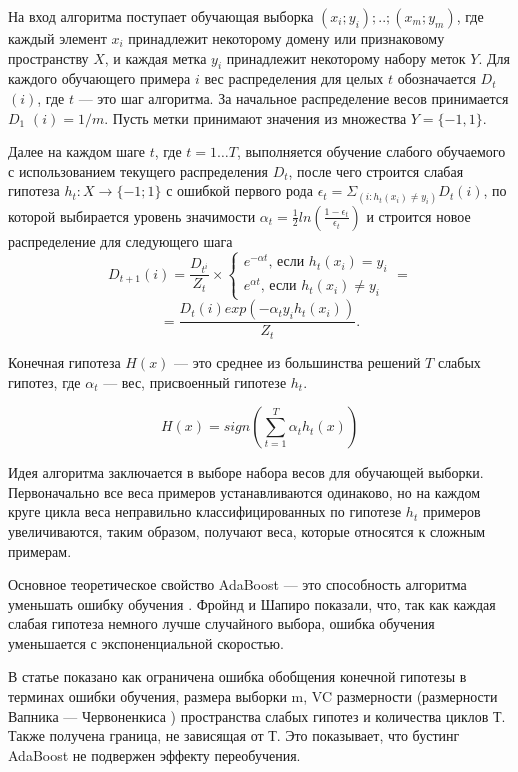 \documentclass{article}
\begin{document}
\begin{articletext}
На вход алгоритма поступает обучающая выборка $(x_i;y_i);..;(x_m;y_m)$, где каждый элемент $x_i$ принадлежит некоторому домену или признаковому пространству $X$, и каждая метка $y_i$ принадлежит некоторому набору меток $Y$. Для каждого обучающего примера $i$ вес распределения для целых $t$ обозначается $D_t$ $(i)$, где $t$ --- это шаг алгоритма. За начальное распределение весов принимается $D_1$ $(i)= 1/m$. Пусть метки принимают значения из множества  $Y=\{-1,1\}$. 

Далее на каждом шаге $t$, где $t = 1 \ldots T$, выполняется обучение слабого обучаемого с использованием текущего распределения $D_t$, после чего строится слабая гипотеза $h_t: X \to \{-1; 1\}$ с ошибкой первого рода $\epsilon_t=\Sigma_{\displaystyle (i:h_t (x_i)\ne y_i)}D_t(i)$, по которой выбирается уровень значимости $\alpha_t=\frac{1}{2}ln(\frac{\displaystyle 1-\epsilon_t}{\displaystyle \epsilon_t})$ и строится новое распределение для следующего шага
$$
D_{t+1}(i)=\frac{D_{t^i}}{Z_t} \times 
\begin{cases}
e^{-\alpha t}\text{, если }h_t (x_i) = y_i \\
e^{\alpha t}\text{, если }h_t (x_i)\ne y_i
\end{cases}
=
$$
$$
= \frac{D_t (i)exp(-\alpha_t y_i h_t (x_i))}{Z_t}. 
$$

Конечная гипотеза $H(x)$ ---  это среднее из большинства решений $T$ слабых гипотез, где $\alpha_t$ --- вес, присвоенный гипотезе $h_t$.

$$
H(x)=sign(\sum_{t=1}^T\alpha_t h_t(x))
$$

Идея алгоритма заключается в выборе набора весов для обучающей выборки. Первоначально все веса примеров устанавливаются одинаково, но на каждом круге цикла веса неправильно классифицированных по гипотезе $h_t$ примеров увеличиваются, таким образом, получают веса, которые относятся к сложным примерам.

Основное теоретическое свойство AdaBoost --- это способность алгоритма уменьшать ошибку обучения \cite{Freund 1999}. Фройнд и Шапиро показали, что, так как каждая слабая гипотеза немного лучше случайного выбора, ошибка обучения уменьшается с экспоненциальной скоростью.

В статье \cite{Freund 1999} показано как ограничена ошибка обобщения конечной гипотезы в терминах ошибки обучения, размера выборки m, VC размерности (размерности Вапника --- Червоненкиса \cite{Schapire 1997}) пространства слабых гипотез и количества циклов Т. Также получена граница, не зависящая от Т. Это показывает, что бустинг AdaBoost не подвержен эффекту переобучения.


\end{articletext}
\end{document}

